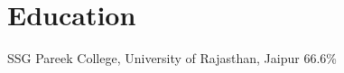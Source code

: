 \documentclass[10pt,a4paper]{article}
\begin{document}
\section{Education}
SSG Pareek College, University of Rajasthan, Jaipur \textbar{} 66.6\%\par
\end{document}
